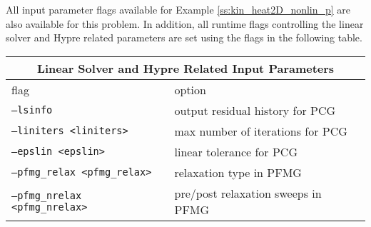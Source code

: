 All input parameter flags available for Example 
\ref{ss:kin_heat2D_nonlin_p} are also available for this problem.
In addition, all runtime flags controlling the linear solver
and Hypre related parameters are set
using the flags in the following table. 
\begin{center}
\begin{tabular}{ |p{6cm}||p{10cm}| }
\hline
\multicolumn{2}{|c|}{Linear Solver and Hypre Related Input Parameters} \\
\hline
flag & option \\
\hline
{\tt --lsinfo} & output residual history for PCG\\
{\tt --liniters <liniters>} & max number of iterations for PCG\\
{\tt --epslin <epslin>} & linear tolerance for PCG\\
{\tt --pfmg\_relax <pfmg\_relax>} & relaxation type in PFMG\\
{\tt --pfmg\_nrelax <pfmg\_nrelax>} & pre/post relaxation sweeps in PFMG\\
\hline
\end{tabular}
\end{center}

